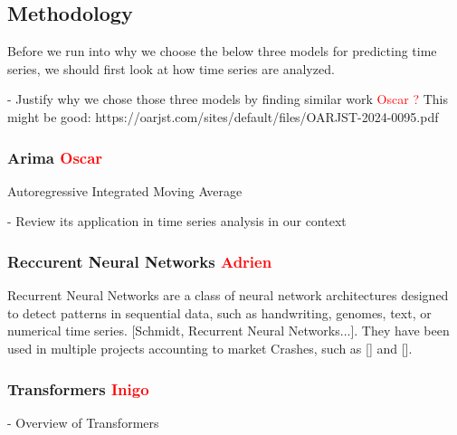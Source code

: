 \documentclass[12pt, letterpaper]{article}
\begin{document}





\subsection*{Methodology}
Before we run into why we choose the below three models for predicting time series, we should first look at how time series are analyzed. 

- Justify why we chose those three models by finding similar work \textcolor{red}{Oscar ?} This might be good: https://oarjst.com/sites/default/files/OARJST-2024-0095.pdf
    \subsubsection*{Arima \textcolor{red}{Oscar}}
    Autoregressive Integrated Moving Average 

    - Review its application in time series analysis in our context
    \subsubsection*{Reccurent Neural Networks \textcolor{red}{Adrien}}
    Recurrent Neural Networks are a class of neural network architectures designed to detect patterns in sequential data, such as handwriting, genomes, text, or numerical time series. [Schmidt, Recurrent Neural Networks...]. They have been used in multiple projects accounting to market Crashes, such as [] and [].

    \subsubsection*{Transformers \textcolor{red}{Inigo}}
    - Overview of Transformers
\end{document}
